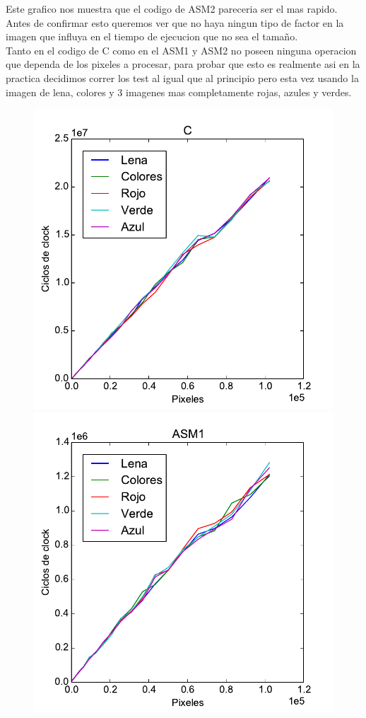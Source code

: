 Este grafico nos muestra que el codigo de ASM2 pareceria ser el mas rapido. Antes de confirmar esto queremos ver que no haya ningun tipo de factor en la imagen que influya en el tiempo de ejecucion que no sea el tamaño. \\

Tanto en el codigo de C como en el ASM1 y ASM2 no poseen ninguna operacion que dependa de los pixeles a procesar, para probar que esto es realmente asi en la practica decidimos correr los test al igual que al principio pero esta vez usando la imagen de lena, colores y 3 imagenes mas completamente rojas, azules y verdes.\\

\begin{figure}[h!]
	\centering
	\includegraphics[scale=0.45]{images/c_blur_lena_colors}
	\includegraphics[scale=0.45]{images/asm1_blur_lena_colors}

\end{figure}
